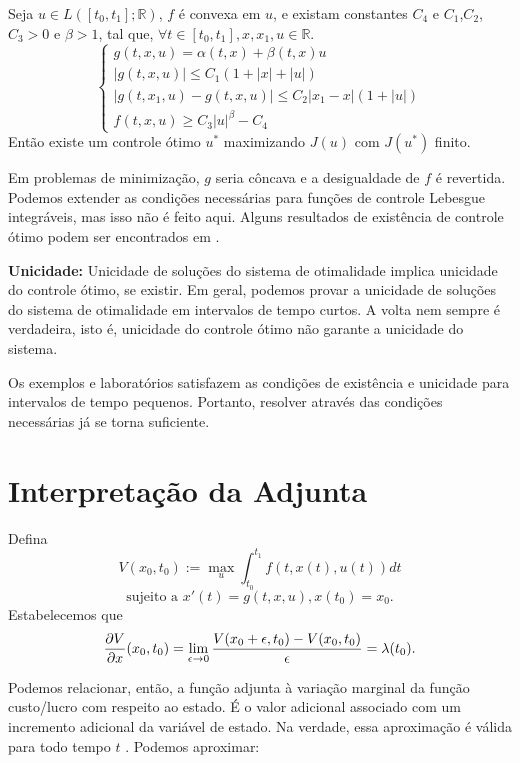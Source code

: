 \begin{theorem}
    Seja $u \in L([t_0,t_1];\mathbb{R})$, $f$ é convexa em $u$, e existam
    constantes $C_4$ e $C_1$,$C_2$,$C_3 >0$ e $\beta > 1$, tal que, $\forall t
    \in [t_0, t_1], x, x_1, u \in \mathbb{R}$. 
    \begin{equation*}
        \begin{cases}
            g(t,x,u) = \alpha (t,x) + \beta (t,x)u \\
            |g(t,x,u)| \leq C_1(1 + |x| + |u|) \\
            |g(t,x_1,u) - g(t,x,u)| \leq C_2|x_1 - x|(1 + |u|) \\
            f(t,x,u) \geq C_3|u|^{\beta} - C_4
        \end{cases}
    \end{equation*}
    Então existe um controle ótimo $u^*$ maximizando $J(u)$ com $J(u^*)$
    finito. 
\end{theorem}

Em problemas de minimização, $g$ seria côncava e a desigualdade de $f$ é
revertida. Podemos extender as condições necessárias para funções de controle
Lebesgue integráveis, mas isso não é feito aqui. Alguns resultados de
existência de controle ótimo podem ser encontrados em \cite{filippov1962}. 

\textbf{Unicidade:} Unicidade de soluções do sistema de otimalidade implica unicidade
do controle ótimo, se existir. Em geral, podemos provar a unicidade de
soluções do sistema de otimalidade em intervalos de tempo curtos. A volta nem
sempre é verdadeira, isto é, unicidade do controle ótimo não garante a
unicidade do sistema. 

Os exemplos e laboratórios satisfazem as condições de existência e unicidade
para intervalos de tempo pequenos. Portanto, resolver através das condições
necessárias já se torna suficiente. 

\section{Interpretação da Adjunta}

Defina 
$$
V(x_0, t_0) := \max_u \int_{t_0}^{t_1} f(t,x(t), u(t)) dt
$$
$$
\text{sujeito a } x'(t) = g(t,x,u), x(t_0) = x_0.
$$
Estabelecemos que 
$$\frac{\partial V}{\partial x}(x_0, t_0) = \lim_{\epsilon \to 0} \frac{V(x_0 + \epsilon,
t_0) - V(x_0,t_0)}{\epsilon} = \lambda(t_0).$$

Podemos relacionar, então, a função adjunta à variação marginal da função
custo/lucro com respeito ao estado. É o valor adicional associado com um 
incremento adicional da variável de estado. Na verdade, essa aproximação é
válida para todo tempo $t$ \cite[136-139]{kamien2012dynamic}. Podemos aproximar: 

